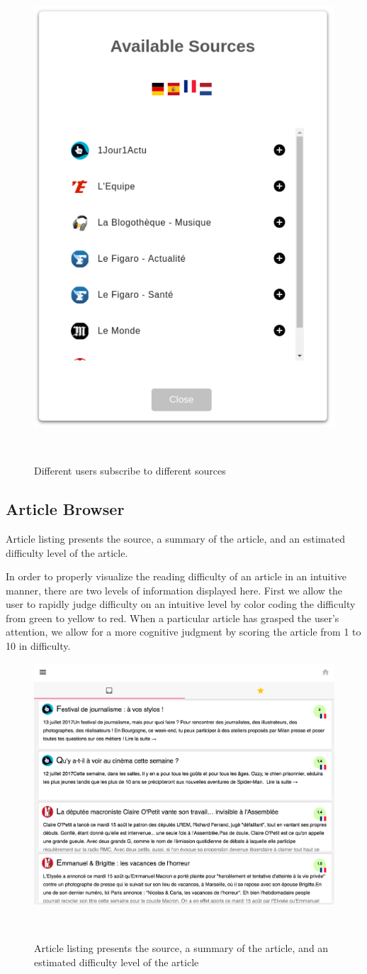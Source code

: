 \begin{figure}[h!]
\centering
  \includegraphics[width=0.5\columnwidth]{figures/available_sources}
  \caption{Different users subscribe to different sources}~\label{fig:registrations}
\end{figure}


\newpage
\subsection{Article Browser}

Article listing presents the source, a summary of the article, and an estimated difficulty level of the article.

In order to properly visualize the reading difficulty of an article in an intuitive manner, there are two levels of information displayed here. First we allow the user to rapidly judge difficulty on an intuitive level by color coding the difficulty from green to yellow to red. When a particular article has grasped the user’s attention, we allow for a more cognitive judgment by scoring the article from 1 to 10 in difficulty.

\begin{figure}[h!]
\centering
  \includegraphics[width=0.7\columnwidth]{figures/article_listing}
  \caption{Article listing presents the source, a summary of the article, and an estimated difficulty level of the article }~\label{fig:registrations}
\end{figure}


